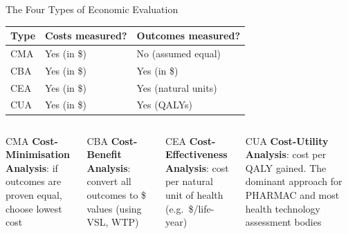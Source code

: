 \documentclass[aspectratio=169, 12pt]{beamer}
\begin{document}
\begin{frame}{The Four Types of Economic Evaluation}
  \begin{center}
    \begin{tabular}{@{}lll@{}}
      \toprule
      \textbf{Type} & \textbf{Costs measured?} & \textbf{Outcomes measured?} \\
      \midrule
      CMA & Yes (in \$) & No (assumed equal) \\
      CBA & Yes (in \$) & Yes (in \$) \\
      CEA & Yes (in \$) & Yes (natural units) \\
      CUA & Yes (in \$) & Yes (QALYs) \\
      \bottomrule
    \end{tabular}
  \end{center}
  \vspace{0.4em}
  \begin{columns}
      \begin{block}{CMA}
        \textbf{Cost-Minimisation Analysis}: if outcomes are proven equal, choose lowest cost
      \end{block}
      \begin{block}{CBA}
        \textbf{Cost-Benefit Analysis}: convert all outcomes to \$ values (using VSL, WTP)
      \end{block}
      \begin{alertblock}{CEA}
        \textbf{Cost-Effectiveness Analysis}: cost per natural unit of health (e.g.\ \$/life-year)
      \end{alertblock}
      \begin{alertblock}{CUA}
        \textbf{Cost-Utility Analysis}: cost per QALY gained. The dominant approach for
        PHARMAC and most health technology assessment bodies
      \end{alertblock}
  \end{columns}
\end{frame}
\end{document}
